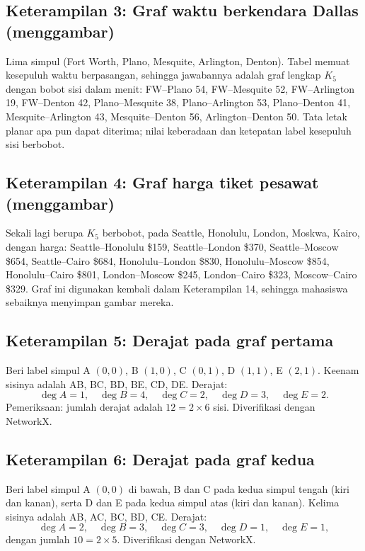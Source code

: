 \subsection*{Keterampilan 3: Graf waktu berkendara Dallas (menggambar)}

Lima simpul (Fort Worth, Plano, Mesquite, Arlington, Denton). Tabel memuat kesepuluh waktu berpasangan, sehingga jawabannya adalah graf lengkap $K_5$ dengan bobot sisi dalam menit:
FW--Plano 54, FW--Mesquite 52, FW--Arlington 19, FW--Denton 42, Plano--Mesquite 38, Plano--Arlington 53, Plano--Denton 41, Mesquite--Arlington 43, Mesquite--Denton 56, Arlington--Denton 50.
Tata letak planar apa pun dapat diterima; nilai keberadaan dan ketepatan label kesepuluh sisi berbobot.

\subsection*{Keterampilan 4: Graf harga tiket pesawat (menggambar)}

Sekali lagi berupa $K_5$ berbobot, pada Seattle, Honolulu, London, Moskwa, Kairo, dengan harga:
Seattle--Honolulu \$159, Seattle--London \$370, Seattle--Moscow \$654, Seattle--Cairo \$684, Honolulu--London \$830, Honolulu--Moscow \$854, Honolulu--Cairo \$801, London--Moscow \$245, London--Cairo \$323, Moscow--Cairo \$329.
Graf ini digunakan kembali dalam Keterampilan 14, sehingga mahasiswa sebaiknya menyimpan gambar mereka.

\subsection*{Keterampilan 5: Derajat pada graf pertama}

Beri label simpul A $(0,0)$, B $(1,0)$, C $(0,1)$, D $(1,1)$, E $(2,1)$. Keenam sisinya adalah AB, BC, BD, BE, CD, DE. Derajat:
\[
\deg A = 1,\quad \deg B = 4,\quad \deg C = 2,\quad \deg D = 3,\quad \deg E = 2.
\]
Pemeriksaan: jumlah derajat adalah $12 = 2 \times 6$ sisi. Diverifikasi dengan NetworkX.

\subsection*{Keterampilan 6: Derajat pada graf kedua}

Beri label simpul A $(0,0)$ di bawah, B dan C pada kedua simpul tengah (kiri dan kanan), serta D dan E pada kedua simpul atas (kiri dan kanan). Kelima sisinya adalah AB, AC, BC, BD, CE. Derajat:
\[
\deg A = 2,\quad \deg B = 3,\quad \deg C = 3,\quad \deg D = 1,\quad \deg E = 1,
\]
dengan jumlah $10 = 2 \times 5$. Diverifikasi dengan NetworkX.

